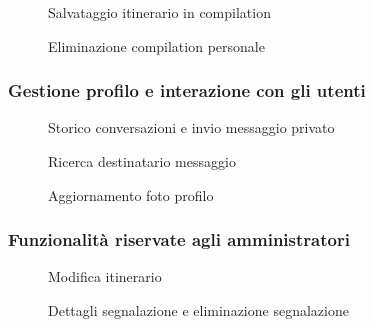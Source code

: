 \documentclass{natourDoc}
\begin{document}
\begin{figure}[!htpb]
	\centering
	
	\caption{Salvataggio itinerario in compilation}
\end{figure}
\FloatBarrier


\begin{figure}[!htpb]
	\centering
	
	\caption{Eliminazione compilation personale}
\end{figure}
\FloatBarrier

\newpage

\subsubsection{Gestione profilo e interazione con gli utenti}
\begin{figure}[!htpb]
	\centering
	
	\caption{Storico conversazioni e invio messaggio privato}
\end{figure}
\FloatBarrier

\begin{figure}[!htpb]
	\centering
	
	\caption{Ricerca destinatario messaggio}
\end{figure}
\FloatBarrier

\begin{figure}[!htpb]
	\centering
	
	\caption{Aggiornamento foto profilo}
\end{figure}
\FloatBarrier

\newpage

\subsubsection{Funzionalità riservate agli amministratori}
\begin{figure}[!htpb]
	\centering
	
	\caption{Modifica itinerario}
\end{figure}
\FloatBarrier

\begin{figure}[!htpb]
	\centering
	
	\caption{Dettagli segnalazione e eliminazione segnalazione}
\end{figure}
\FloatBarrier
\end{document}
